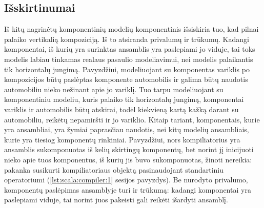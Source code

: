 \subsection{Išskirtinumai}


Iš kitų \cite{classification-framework-for-scm} nagrinėtų komponentinių
modelių  komponentinis išsiskiria tuo, kad
pilnai palaiko vertikalią kompoziciją. Iš to atsiranda privalumų
ir trūkumų. Kadangi komponentai, iš kurių yra surinktas ansamblis
yra paslepiami jo viduje, tai toks modelis labiau tinkamas realaus
pasaulio modeliavimui, nei modelis palaikantis tik horizontalų jungimą.
Pavyzdžiui, modeliuojant su  komponentas variklis po
kompozicijos būtų paslėptas komponente automobilis ir galima būtų
naudotis automobiliu nieko nežinant apie jo variklį. Tuo tarpu
modeliuojant su komponentiniu modeliu, kuris palaiko tik horizontalų
jungimą, komponentai variklis ir automobilis būtų atskirai, todėl
kiekvieną kartą kažką darant su automobiliu, reikėtų nepamiršti
ir jo variklio. Kitaip tariant,  komponentais, kurie
yra ansambliai, yra žymiai paprasčiau naudotis, nei kitų modelių
ansambliais, kurie yra tiesiog komponentų rinkiniai. Pavyzdžiui,
nors  kompiliatorius yra ansamblis sukomponuotas
iš kelių skirtingų komponentų, bet norint jį inicijuoti nieko apie
tuos komponentus, iš kurių jis buvo sukomponuotas, žinoti nereikia:
pakanka susikurti kompiliatoriaus objektą pasinaudojant standartiniu
 operatoriumi (\ref{lst:scala:compiler:1} 
sesijos pavyzdys). Be nurodyto privalumo, komponentų paslėpimas
ansamblyje turi ir trūkumą: kadangi komponentai yra paslepiami viduje,
tai norint juos pakeisti gali reikėti išardyti ansamblį.


